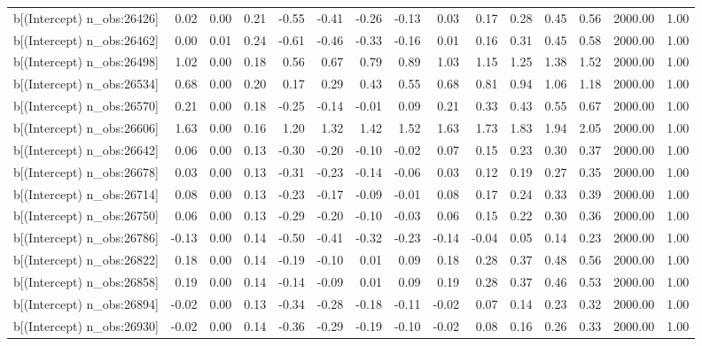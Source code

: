 \begin{table}[ht]
\begin{tabular}{rrrrrrrrrrrrrrr}
  b[(Intercept) n\_obs:26426] & 0.02 & 0.00 & 0.21 & -0.55 & -0.41 & -0.26 & -0.13 & 0.03 & 0.17 & 0.28 & 0.45 & 0.56 & 2000.00 & 1.00 \\ 
  b[(Intercept) n\_obs:26462] & 0.00 & 0.01 & 0.24 & -0.61 & -0.46 & -0.33 & -0.16 & 0.01 & 0.16 & 0.31 & 0.45 & 0.58 & 2000.00 & 1.00 \\ 
  b[(Intercept) n\_obs:26498] & 1.02 & 0.00 & 0.18 & 0.56 & 0.67 & 0.79 & 0.89 & 1.03 & 1.15 & 1.25 & 1.38 & 1.52 & 2000.00 & 1.00 \\ 
  b[(Intercept) n\_obs:26534] & 0.68 & 0.00 & 0.20 & 0.17 & 0.29 & 0.43 & 0.55 & 0.68 & 0.81 & 0.94 & 1.06 & 1.18 & 2000.00 & 1.00 \\ 
  b[(Intercept) n\_obs:26570] & 0.21 & 0.00 & 0.18 & -0.25 & -0.14 & -0.01 & 0.09 & 0.21 & 0.33 & 0.43 & 0.55 & 0.67 & 2000.00 & 1.00 \\ 
  b[(Intercept) n\_obs:26606] & 1.63 & 0.00 & 0.16 & 1.20 & 1.32 & 1.42 & 1.52 & 1.63 & 1.73 & 1.83 & 1.94 & 2.05 & 2000.00 & 1.00 \\ 
  b[(Intercept) n\_obs:26642] & 0.06 & 0.00 & 0.13 & -0.30 & -0.20 & -0.10 & -0.02 & 0.07 & 0.15 & 0.23 & 0.30 & 0.37 & 2000.00 & 1.00 \\ 
  b[(Intercept) n\_obs:26678] & 0.03 & 0.00 & 0.13 & -0.31 & -0.23 & -0.14 & -0.06 & 0.03 & 0.12 & 0.19 & 0.27 & 0.35 & 2000.00 & 1.00 \\ 
  b[(Intercept) n\_obs:26714] & 0.08 & 0.00 & 0.13 & -0.23 & -0.17 & -0.09 & -0.01 & 0.08 & 0.17 & 0.24 & 0.33 & 0.39 & 2000.00 & 1.00 \\ 
  b[(Intercept) n\_obs:26750] & 0.06 & 0.00 & 0.13 & -0.29 & -0.20 & -0.10 & -0.03 & 0.06 & 0.15 & 0.22 & 0.30 & 0.36 & 2000.00 & 1.00 \\ 
  b[(Intercept) n\_obs:26786] & -0.13 & 0.00 & 0.14 & -0.50 & -0.41 & -0.32 & -0.23 & -0.14 & -0.04 & 0.05 & 0.14 & 0.23 & 2000.00 & 1.00 \\ 
  b[(Intercept) n\_obs:26822] & 0.18 & 0.00 & 0.14 & -0.19 & -0.10 & 0.01 & 0.09 & 0.18 & 0.28 & 0.37 & 0.48 & 0.56 & 2000.00 & 1.00 \\ 
  b[(Intercept) n\_obs:26858] & 0.19 & 0.00 & 0.14 & -0.14 & -0.09 & 0.01 & 0.09 & 0.19 & 0.28 & 0.37 & 0.46 & 0.53 & 2000.00 & 1.00 \\ 
  b[(Intercept) n\_obs:26894] & -0.02 & 0.00 & 0.13 & -0.34 & -0.28 & -0.18 & -0.11 & -0.02 & 0.07 & 0.14 & 0.23 & 0.32 & 2000.00 & 1.00 \\ 
  b[(Intercept) n\_obs:26930] & -0.02 & 0.00 & 0.14 & -0.36 & -0.29 & -0.19 & -0.10 & -0.02 & 0.08 & 0.16 & 0.26 & 0.33 & 2000.00 & 1.00 \\ 

\end{tabular}
\end{table}
